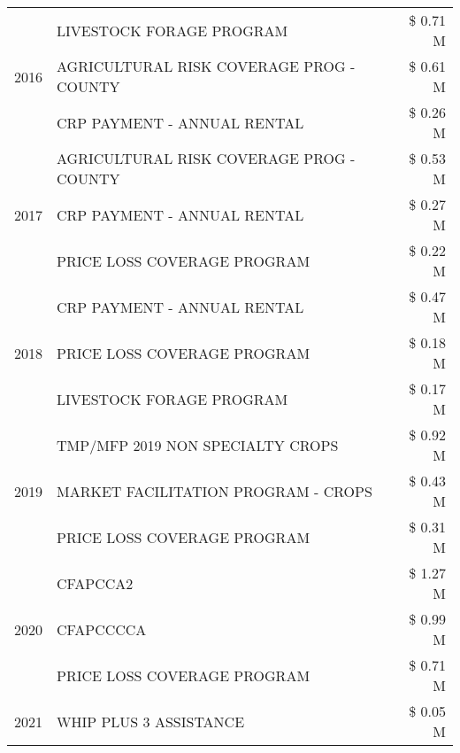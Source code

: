 \begin{tabular}{llr}
\multirow[t]{3}{*}{2016} & LIVESTOCK FORAGE PROGRAM & \$ 0.71 M \\
 & AGRICULTURAL RISK COVERAGE PROG - COUNTY & \$ 0.61 M \\
 & CRP PAYMENT - ANNUAL RENTAL & \$ 0.26 M \\
\cline{1-3}
\multirow[t]{3}{*}{2017} & AGRICULTURAL RISK COVERAGE PROG - COUNTY & \$ 0.53 M \\
 & CRP PAYMENT - ANNUAL RENTAL & \$ 0.27 M \\
 & PRICE LOSS COVERAGE PROGRAM & \$ 0.22 M \\
\cline{1-3}
\multirow[t]{3}{*}{2018} & CRP PAYMENT - ANNUAL RENTAL & \$ 0.47 M \\
 & PRICE LOSS COVERAGE PROGRAM & \$ 0.18 M \\
 & LIVESTOCK FORAGE PROGRAM & \$ 0.17 M \\
\cline{1-3}
\multirow[t]{3}{*}{2019} & TMP/MFP 2019 NON SPECIALTY CROPS & \$ 0.92 M \\
 & MARKET FACILITATION PROGRAM - CROPS & \$ 0.43 M \\
 & PRICE LOSS COVERAGE PROGRAM & \$ 0.31 M \\
\cline{1-3}
\multirow[t]{3}{*}{2020} & CFAPCCA2 & \$ 1.27 M \\
 & CFAPCCCCA & \$ 0.99 M \\
 & PRICE LOSS COVERAGE PROGRAM & \$ 0.71 M \\
\cline{1-3}
2021 & WHIP PLUS 3 ASSISTANCE & \$ 0.05 M \\
\cline{1-3}
\bottomrule
\end{tabular}

